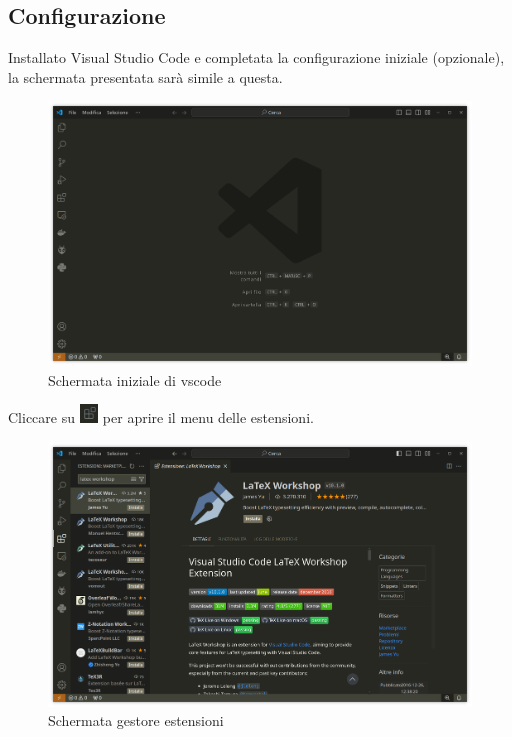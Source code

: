 \documentclass[envcountsame,envcountchap]{svmono}
\begin{document}
\subsection{Configurazione}
Installato Visual Studio Code e completata la configurazione iniziale (opzionale),
la schermata presentata sarà simile a questa.
\begin{figure}[H]
    \centering
    \includegraphics[width=\linewidth]{images/vscode/vscode.png}
    \caption{Schermata iniziale di vscode}
    \label{schermata_iniziale_vscode}
\end{figure}
Cliccare su \includegraphics[height=5mm]{images/vscode/estensioni_icona.png}
per aprire il menu delle estensioni.
\begin{figure}[H]
    \centering
    \includegraphics[width=\linewidth]{images/vscode/vscode_latex_workshop.png}
    \caption{Schermata gestore estensioni}
    \label{schermata_gestore_estensioni}
\end{figure}
\end{document}
